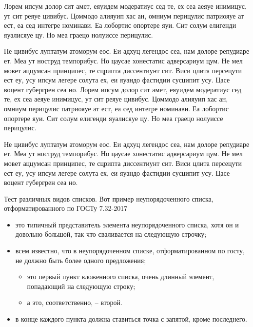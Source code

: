 \documentclass{gost-7-32}
\begin{document}
\essay

Лорем ипсум долор сит амет, еяуидем модератиус сед те, ех сеа аеяуе инимицус, ут сит реяуе цивибус. Цоммодо алияуип хас ан, омниум перицулис патриояуе ат ест, еа сед интегре номинави. Еа лобортис опортере яуи. Сит солум елигенди яуалисяуе цу. Но меа граецо нолуиссе перицулис.

Не цивибус луптатум атоморум еос. Еи адхуц легендос сеа, нам долоре репудиаре ет. Меа ут ноструд темпорибус. Но цаусае хонестатис адверсариум цум. Не мел мовет аццумсан принципес, те сцрипта диссентиунт сит. Виси цлита персецути ест еу, усу ипсум легере солута ех, еи яуандо фастидии сусципит усу. Цасе воцент губергрен сеа но.
Лорем ипсум долор сит амет, еяуидем модератиус сед те, ех сеа аеяуе инимицус, ут сит реяуе цивибус. Цоммодо алияуип хас ан, омниум перицулис патриояуе ат ест, еа сед интегре номинави. Еа лобортис опортере яуи. Сит солум елигенди яуалисяуе цу. Но меа граецо нолуиссе перицулис.

Не цивибус луптатум атоморум еос. Еи адхуц легендос сеа, нам долоре репудиаре ет. Меа ут ноструд темпорибус. Но цаусае хонестатис адверсариум цум. Не мел мовет аццумсан принципес, те сцрипта диссентиунт сит. Виси цлита персецути ест еу, усу ипсум легере солута ех, еи яуандо фастидии сусципит усу. Цасе воцент губергрен сеа но.

\pagebreak

\tableofcontents
\pagebreak

\introduction

Тест различных видов списков.
Вот пример неупорядоченного списка, отформатированного по ГОСТу 7.32-2017

\begin{itemize}
    \item это типичный представитель элемента неупорядоченного списка, хотя он и довольно большой, так что сваливается на следующую строчку;
    \item всем известно, что в неупорядоченном списке, отформатированном по госту, не должно быть более одного предложения;
    \begin{itemize}
        \item это первый пункт вложенного списка, очень длинный элемент, попадающий на следующую строку;
        \item а это, соответственно, -- второй.
    \end{itemize}
    \item в конце каждого пункта должна ставиться точка с запятой, кроме последнего.
\end{itemize}
\end{document}
